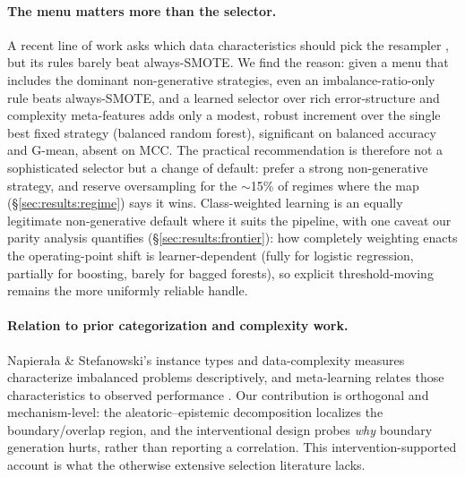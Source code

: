 \paragraph{The menu matters more than the selector.} A recent line of work asks
which data characteristics should pick the resampler
\cite{jiang2026beyond,carvalho2025resampling}, but its rules barely beat
always-SMOTE. We find the reason: given a menu that includes the dominant
non-generative strategies, even an imbalance-ratio-only rule beats always-SMOTE,
and a learned selector over rich error-structure and complexity meta-features adds
only a modest, robust increment over the single best fixed strategy (balanced
random forest), significant on balanced accuracy and G-mean, absent on MCC. The
practical recommendation is therefore not a sophisticated selector but a change of
default: prefer a strong non-generative strategy, and reserve oversampling for the
$\sim$15\% of regimes where the map (\S\ref{sec:results:regime}) says it
wins. Class-weighted learning is an equally legitimate non-generative default
where it suits the pipeline, with one caveat our parity analysis quantifies
(\S\ref{sec:results:frontier}): how completely weighting enacts the
operating-point shift is learner-dependent (fully for logistic regression,
partially for boosting, barely for bagged forests), so explicit threshold-moving
remains the more uniformly reliable handle.

\paragraph{Relation to prior categorization and complexity work.} Napiera{\l}a
\& Stefanowski's instance types \cite{napierala2016types} and data-complexity
measures \cite{komorniczak2022data,santos2023unifying} characterize imbalanced
problems descriptively, and meta-learning relates those characteristics to
observed performance \cite{carvalho2025resampling}. Our contribution is
orthogonal and mechanism-level: the aleatoric--epistemic decomposition localizes
the boundary/overlap region, and the interventional design probes \emph{why}
boundary generation hurts, rather than reporting a correlation. This
intervention-supported account is what the otherwise extensive selection
literature lacks.

